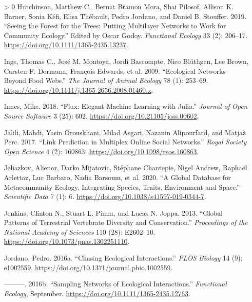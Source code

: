 \documentclass[11pt]{article}
\newlength{\cslhangindent}
\newenvironment{CSLReferences}[3] %
 {%
  \setlength{\parindent}{0pt}
  \ifodd #1 \everypar{\setlength{\hangindent}{\cslhangindent}}\ignorespaces\fi
  \ifnum #2 > 0
  \setlength{\parskip}{#2\baselineskip}
  \fi
 }%
 {}
\begin{document}
\begin{CSLReferences}{1}{0}
\leavevmode\hypertarget{ref-Hutchinson2019SeeFor}{}%
Hutchinson, Matthew C., Bernat Bramon Mora, Shai Pilosof, Allison K.
Barner, Sonia Kéfi, Elisa Thébault, Pedro Jordano, and Daniel B.
Stouffer. 2019. {``Seeing the Forest for the Trees: Putting Multilayer
Networks to Work for Community Ecology.''} Edited by Oscar Godoy.
\emph{Functional Ecology} 33 (2): 206--17.
\url{https://doi.org/10.1111/1365-2435.13237}.

\leavevmode\hypertarget{ref-Ings2009EcoNet}{}%
Ings, Thomas C., José M. Montoya, Jordi Bascompte, Nico Blüthgen, Lee
Brown, Carsten F. Dormann, François Edwards, et al. 2009. {``Ecological
Networks--Beyond Food Webs.''} \emph{The Journal of Animal Ecology} 78
(1): 253--69. \url{https://doi.org/10.1111/j.1365-2656.2008.01460.x}.

\leavevmode\hypertarget{ref-Innes2018FluEle}{}%
Innes, Mike. 2018. {``Flux: Elegant Machine Learning with Julia.''}
\emph{Journal of Open Source Software} 3 (25): 602.
\url{https://doi.org/10.21105/joss.00602}.

\leavevmode\hypertarget{ref-Jalili2017LinPre}{}%
Jalili, Mahdi, Yasin Orouskhani, Milad Asgari, Nazanin Alipourfard, and
Matjaž Perc. 2017. {``Link Prediction in Multiplex Online Social
Networks.''} \emph{Royal Society Open Science} 4 (2): 160863.
\url{https://doi.org/10.1098/rsos.160863}.

\leavevmode\hypertarget{ref-Jeliazkov2020GloDat}{}%
Jeliazkov, Alienor, Darko Mijatovic, Stéphane Chantepie, Nigel Andrew,
Raphaël Arlettaz, Luc Barbaro, Nadia Barsoum, et al. 2020. {``A Global
Database for Metacommunity Ecology, Integrating Species, Traits,
Environment and Space.''} \emph{Scientific Data} 7 (1): 6.
\url{https://doi.org/10.1038/s41597-019-0344-7}.

\leavevmode\hypertarget{ref-Jenkins2013GloPat}{}%
Jenkins, Clinton N., Stuart L. Pimm, and Lucas N. Joppa. 2013. {``Global
Patterns of Terrestrial Vertebrate Diversity and Conservation.''}
\emph{Proceedings of the National Academy of Sciences} 110 (28):
E2602--10. \url{https://doi.org/10.1073/pnas.1302251110}.

\leavevmode\hypertarget{ref-Jordano2016ChaEco}{}%
Jordano, Pedro. 2016a. {``Chasing Ecological Interactions.''} \emph{PLOS
Biology} 14 (9): e1002559.
\url{https://doi.org/10.1371/journal.pbio.1002559}.

\leavevmode\hypertarget{ref-Jordano2016SamNet}{}%
---------. 2016b. {``Sampling Networks of Ecological Interactions.''}
\emph{Functional Ecology}, September.
\url{https://doi.org/10.1111/1365-2435.12763}.


\end{CSLReferences}
\end{document}
